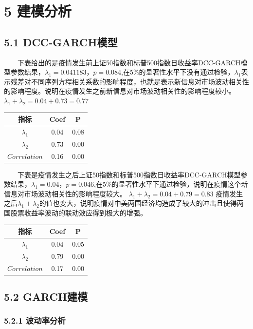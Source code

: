 \documentclass[
  11pt,
  letterpaper,
]{article}
\begin{document}
\hypertarget{ux5efaux6a21ux5206ux6790}{%
\section{5 建模分析}\label{ux5efaux6a21ux5206ux6790}}

\hypertarget{dcc-garchux6a21ux578b-1}{%
\subsection{5.1 DCC-GARCH模型}\label{dcc-garchux6a21ux578b-1}}

  下表给出的是疫情发生前上证50指数和标普500指数日收益率DCC-GARCH模型参数结果，\(\lambda_1=0.041183，p=0.084\),在5\%的显著性水平下没有通过检验，\(\lambda_1\)表示残差对不同序列方程相关系数的影响程度，也就是表示新信息对市场波动相关性的影响程度。说明在疫情发生之前新信息对市场波动相关性的影响程度较小。
\(\lambda_1+\lambda_2 =0.04+0.73=0.77\)

\begin{longtable}[]{@{}ccc@{}}
\toprule
指标 & Coef & P\tabularnewline
\midrule
\endhead
\(\lambda_1\) & 0.04 & 0.08\tabularnewline
\(\lambda_2\) & 0.73 & 0.00\tabularnewline
\(Correlation\) & 0.16 & 0.00\tabularnewline
\bottomrule
\end{longtable}

  下表是疫情发生之后上证50指数和标普500指数日收益率DCC-GARCH模型参数结果，\(\lambda_1=0.04，p=0.046\),在5\%的显著性水平下通过检验，说明在疫情这个新信息对市场波动相关性的影响程度较大。
\(\lambda_1+\lambda_2=0.04+0.79=0.83\)
疫情发生之后\(\lambda_1+\lambda_2\)的值也变大，说明疫情对中美两国经济均造成了较大的冲击且使得两国股票收益率波动的联动效应得到极大的增强。

\begin{longtable}[]{@{}ccc@{}}
\toprule
指标 & Coef & P\tabularnewline
\midrule
\endhead
\(\lambda_1\) & 0.04 & 0.05\tabularnewline
\(\lambda_2\) & 0.79 & 0.00\tabularnewline
\(Correlation\) & 0.17 & 0.00\tabularnewline
\bottomrule
\end{longtable}

\hypertarget{garchux5efaux6a21}{%
\subsection{5.2 GARCH建模}\label{garchux5efaux6a21}}

\hypertarget{ux6ce2ux52a8ux7387ux5206ux6790}{%
\subsubsection{5.2.1 波动率分析}\label{ux6ce2ux52a8ux7387ux5206ux6790}}
\end{document}
